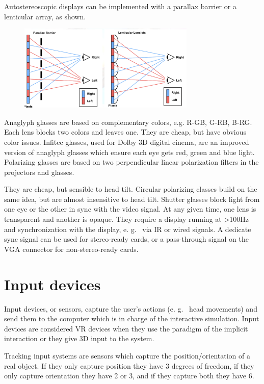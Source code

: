 \documentclass[a4paper]{article}
\begin{document}
Autostereoscopic displays can be implemented with a parallax barrier or
a lenticular array, as shown.

\begin{figure}
\centering
\includegraphics[width=0.75\textwidth]{autostereoscopic-impl}
\end{figure}

Anaglyph glasses are based on complementary colors, e.g. R-GB, G-RB, B-RG.
Each lens blocks two colors and leaves one.
They are cheap, but
have obvious color issues.
Infitec glasses, used for Dolby 3D digital
cinema, are an improved version of anaglyph glasses which ensure each
eye gets red, green and blue light.
Polarizing glasses are based on two
perpendicular linear polarization filters in the projectors and glasses.

They are cheap, but sensible to head tilt.
Circular polarizing classes
build on the same idea, but are almost insensitive to head tilt.
Shutter
glasses block light from one eye or the other in sync with the video
signal.
At any given time, one lens is transparent and another is
opaque.
They require a display running at \textgreater100Hz and
synchronization with the display, e.
g.
~via IR or wired signals.
A
dedicate sync signal can be used for stereo-ready cards, or a
pass-through signal on the VGA connector for non-stereo-ready cards.

\section{Input devices}

Input devices, or sensors, capture the user's actions (e.
g.
~head
movements) and send them to the computer which is in charge of the
interactive simulation.
Input devices are considered VR devices when
they use the paradigm of the implicit interaction or they give 3D input
to the system.

Tracking input systems are sensors which capture the
position/orientation of a real object.
If they only capture position
they have 3 degrees of freedom, if they only capture orientation they
have 2 or 3, and if they capture both they have 6.
\end{document}
